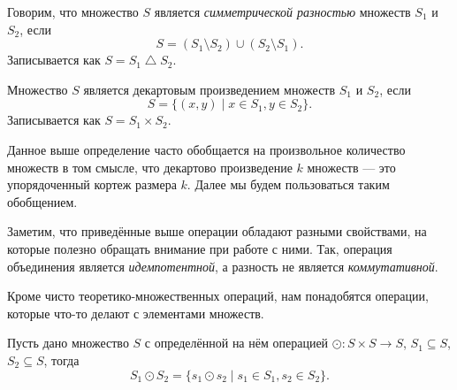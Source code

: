 \begin{definition}
    Говорим, что множество $S$ является \emph{симметрической разностью} множеств $S_1$ и $S_2$, если
    \[S = (S_1 \setminus S_2) \cup (S_2 \setminus S_1).\]
    Записывается как $S = S_1 \bigtriangleup S_2$.
\end{definition}


\begin{definition}
    Множество $S$ является декартовым произведением множеств $S_1$ и $S_2$, если
    \[S = \{ (x,y) \mid x \in S_1, y \in S_2 \}.\]
    Записывается как $S = S_1 \times S_2$.
\end{definition}

Данное выше определение часто обобщается на произвольное количество множеств в том смысле, что декартово произведение $k$ множеств --- это упорядоченный кортеж
размера $k$.
Далее мы будем пользоваться таким обобщением.

Заметим, что приведённые выше операции обладают разными свойствами, на которые полезно обращать внимание при работе с ними.
Так, операция объединения является \emph{идемпотентной}, а разность не является \emph{коммутативной}.

Кроме чисто теоретико-множественных операций, нам понадобятся операции, которые что-то делают с элементами множеств.

\begin{definition}
    Пусть дано множество $S$ с определённой на нём операцией $\odot: S \times S \to S$, $S_1 \subseteq S$, $S_2 \subseteq S$, тогда
    \[S_1 \odot S_2 = \{ s_1 \odot s_2 \mid s_1 \in S_1, s_2 \in S_2\}.\]
\end{definition}

